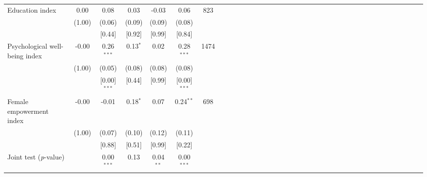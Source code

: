 {\begin{tabular}{l*{6}{SSSSSc}}
Education index&     0.00&     0.08&     0.03&    -0.03&     0.06&      823\\
          &   (1.00)&   (0.06)&   (0.09)&   (0.09)&   (0.08)&         \\
          &         &   [0.44]&   [0.92]&   [0.99]&   [0.84]&         \\
Psychological well-being index&    -0.00&0.26$^{***}$&0.13$^{*}$&     0.02&0.28$^{***}$&     1474\\
          &   (1.00)&   (0.05)&   (0.08)&   (0.08)&   (0.08)&         \\
          &         &[0.00]$^{***}$&   [0.44]&   [0.99]&[0.00]$^{***}$&         \\
Female empowerment index&    -0.00&    -0.01&0.18$^{*}$&     0.07&0.24$^{**}$&      698\\
          &   (1.00)&   (0.07)&   (0.10)&   (0.12)&   (0.11)&         \\
          &         &   [0.88]&   [0.51]&   [0.99]&   [0.22]&         \\
\midrule Joint test (\emph{p}-value)&         &0.00$^{***}$&     0.13&0.04$^{**}$&0.00$^{***}$&         \\
\bottomrule
\end{tabular}
}

